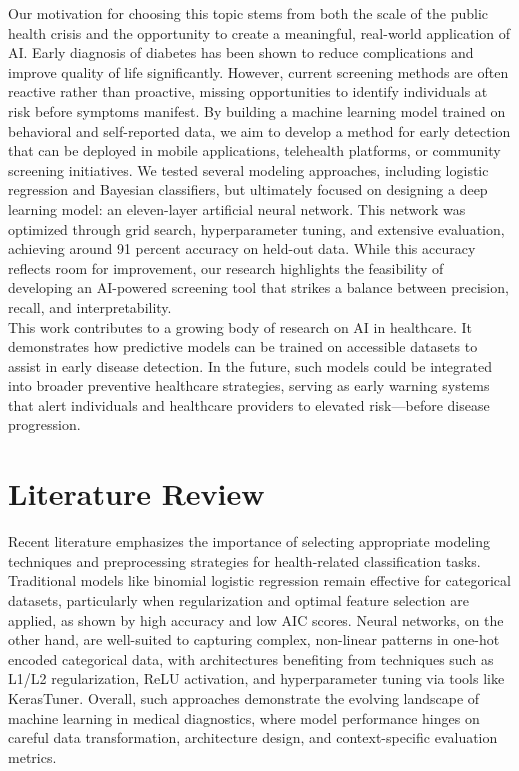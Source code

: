 \documentclass[conference]{IEEEtran}
\begin{document}
Our motivation for choosing this topic stems from both the scale of the public health crisis and the opportunity to create a meaningful, real-world application of AI. Early diagnosis of diabetes has been shown to reduce complications and improve quality of life significantly. However, current screening methods are often reactive rather than proactive, missing opportunities to identify individuals at risk before symptoms manifest. By building a machine learning model trained on behavioral and self-reported data, we aim to develop a method for early detection that can be deployed in mobile applications, telehealth platforms, or community screening initiatives.
We tested several modeling approaches, including logistic regression and Bayesian classifiers, but ultimately focused on designing a deep learning model: an eleven-layer artificial neural network. This network was optimized through grid search, hyperparameter tuning, and extensive evaluation, achieving around 91 percent accuracy on held-out data. While this accuracy reflects room for improvement, our research highlights the feasibility of developing an AI-powered screening tool that strikes a balance between precision, recall, and interpretability. \\

This work contributes to a growing body of research on AI in healthcare. It demonstrates how predictive models can be trained on accessible datasets to assist in early disease detection. In the future, such models could be integrated into broader preventive healthcare strategies, serving as early warning systems that alert individuals and healthcare providers to elevated risk—before disease progression. \\

\section{Literature Review}
Recent literature emphasizes the importance of selecting appropriate modeling techniques and preprocessing strategies for health-related classification tasks. Traditional models like binomial logistic regression remain effective for categorical datasets, particularly when regularization and optimal feature selection are applied, as shown by high accuracy and low AIC scores. Neural networks, on the other hand, are well-suited to capturing complex, non-linear patterns in one-hot encoded categorical data, with architectures benefiting from techniques such as L1/L2 regularization, ReLU activation, and hyperparameter tuning via tools like KerasTuner. Overall, such approaches demonstrate the evolving landscape of machine learning in medical diagnostics, where model performance hinges on careful data transformation, architecture design, and context-specific evaluation metrics.\\
\end{document}
